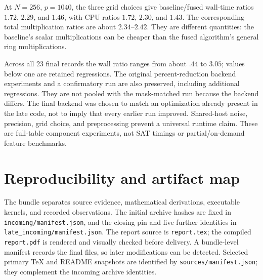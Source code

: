 \documentclass[11pt,letterpaper]{article}
\theoremstyle{remark}\newtheorem{remark}[theorem]{Remark}
\begin{document}
At $N=256$, $p=1040$, the three grid choices give baseline/fused wall-time
ratios $1.72$, $2.29$, and $1.46$, with CPU ratios $1.72$, $2.30$, and $1.43$.
The corresponding total multiplication ratios are about $2.34$--$2.42$.
They are different quantities: the baseline's scalar multiplications can be
cheaper than the fused algorithm's general ring multiplications.

Across all 23 final records the wall ratio ranges from about $.44$ to $3.05$;
values below one are retained regressions. The original percent-reduction
backend experiments and a confirmatory run are also preserved, including
additional regressions. They are not pooled with the mask-matched run because
the backend differs. The final backend was chosen to match an optimization
already present in the late code, not to imply that every earlier run improved.
Shared-host noise, precision, grid choice, and preprocessing prevent a universal
runtime claim. These are full-table component experiments, not SAT timings or
partial/on-demand feature benchmarks.

\section{Reproducibility and artifact map}
\label{sec:repro}
The bundle separates source evidence, mathematical derivations, executable kernels, and recorded observations. The initial archive hashes are fixed in \texttt{incoming/manifest.json}, and the closing pin and five further identities in \texttt{late\_incoming/manifest.json}. The report source is \texttt{report.tex}; the compiled \texttt{report.pdf} is rendered and visually checked before delivery. A bundle-level manifest records the final files, so later modifications can be detected. Selected primary TeX and README snapshots are identified by \texttt{sources/manifest.json}; they complement the incoming archive identities.
\end{document}
